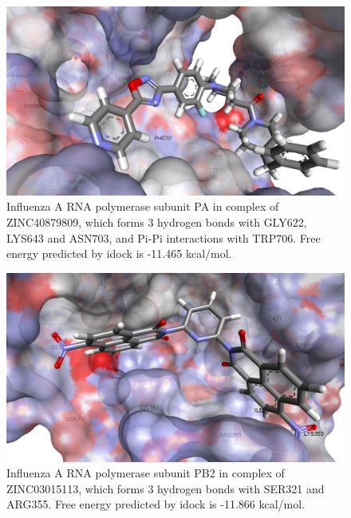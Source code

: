 \begin{figure}
\centering
\includegraphics[width=\linewidth]{../influenza/2ZNL-ZINC40879809.png}
\caption{Influenza A RNA polymerase subunit PA in complex of ZINC40879809, which forms 3 hydrogen bonds with GLY622, LYS643 and ASN703, and Pi-Pi interactions with TRP706. Free energy predicted by idock is -11.465 kcal/mol.}
\label{influenza:2ZNL-ZINC40879809}
\end{figure}

\begin{figure}
\centering
\includegraphics[width=\linewidth]{../influenza/2VQZ-ZINC03015113.png}
\caption{Influenza A RNA polymerase subunit PB2 in complex of ZINC03015113, which forms 3 hydrogen bonds with SER321 and ARG355. Free energy predicted by idock is -11.866 kcal/mol.}
\label{influenza:2VQZ-ZINC03015113}
\end{figure}

